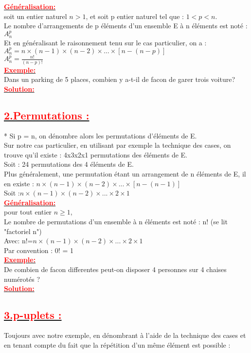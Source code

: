 \documentclass[12pt]{article}
\begin{document}
\underline{\textbf{\textcolor{red}{Généralisation:}}}\\
soit un entier naturel $n > 1$, et soit p entier naturel tel que : $1 < p < n$.\\
Le nombre d’arrangements de p éléments d’un ensemble E à n éléments est noté : $A_{n}^{p}$\\
Et en généralisant le raisonnement tenu sur le cas particulier, on a : \\
$A_{n}^{p}=n\times(n-1)\times(n-2)\times...\times[n-(n-p)]$\\
$A_{n}^{p}=\frac{n!}{(n-p)!}$\\
\underline{\textbf{\textcolor{red}{Exemple:}}}\\
Dans un parking de 5 places, combien y a-t-il de facon de garer trois voiture?\\
\underline{\textbf{\textcolor{red}{Solution:}}}\\
\subsection*{\underline{\textbf{\textcolor{red}{2.Permutations :}}}}
* Si p = n, on dénombre alors les permutations d’éléments de E.\\
Sur notre cas particulier, en utilisant par exemple la technique des cases, on trouve qu’il existe : 4x3x2x1 permutations des éléments de E.\\
Soit : 24 permutations des 4 éléments de E.\\
Plus généralement, une permutation étant un arrangement de n éléments de E, il en existe :
$n\times(n-1)\times(n-2)\times...\times[n-(n-1)]$\\
Soit :$n\times(n-1)\times(n-2)\times...\times2\times1$\\
\underline{\textbf{\textcolor{red}{Généralisation:}}}\\
pour tout entier $n \geq 1$,\\
Le nombre de permutations d’un ensemble à n éléments est noté : n! (se lit "factoriel n")\\
Avec: n!=$n\times(n-1)\times(n-2)\times...\times2\times1$\\
Par convention : 0! = 1\\
\underline{\textbf{\textcolor{red}{Exemple:}}}\\
De combien de facon differentes peut-on disposer 4 personnes sur 4 chaises numérotés ?\\
\underline{\textbf{\textcolor{red}{Solution:}}}\\
\subsection*{\underline{\textbf{\textcolor{red}{3.p-uplets :}}}}
Toujours avec notre exemple, en dénombrant à l’aide de la technique des cases et en tenant compte du fait que la répétition d’un même élément est possible :\\
\end{document}
